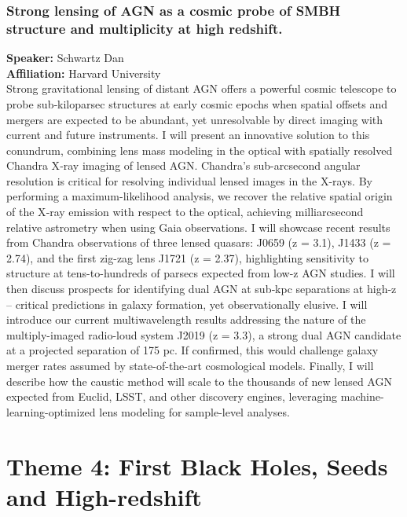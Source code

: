 \subsubsection*{Strong lensing of AGN as a cosmic probe of SMBH structure and multiplicity at high redshift.}
\textbf{Speaker:} Schwartz Dan \\
\textbf{Affiliation:} Harvard University\\
Strong gravitational lensing of distant AGN offers a powerful cosmic telescope to probe sub‑kiloparsec structures at early cosmic epochs when spatial offsets and mergers are expected to be abundant, yet unresolvable by direct imaging with current and future instruments. I will present an innovative solution to this conundrum, combining lens mass modeling in the optical with spatially resolved Chandra X‑ray imaging of lensed AGN. Chandra’s sub-arcsecond angular resolution is critical for resolving individual lensed images in the X-rays. By performing a maximum-likelihood analysis, we recover the relative spatial origin of the X‑ray emission with respect to the optical, achieving milliarcsecond relative astrometry when using Gaia observations. 
I will showcase recent results from Chandra observations of three lensed quasars: J0659 (z = 3.1), J1433 (z = 2.74), and the first zig-zag lens J1721 (z = 2.37), highlighting sensitivity to structure at tens-to-hundreds of parsecs expected from low-z AGN studies. I will then discuss prospects for identifying dual AGN at sub‑kpc separations at high-z – critical predictions in galaxy formation, yet observationally elusive. I will introduce our current multiwavelength results addressing the nature of the multiply-imaged radio-loud system J2019 (z = 3.3), a strong dual AGN candidate at a projected separation of 175 pc. If confirmed, this would challenge galaxy merger rates assumed by state-of-the-art cosmological models.
Finally, I will describe how the caustic method will scale to the thousands of new lensed AGN expected from Euclid, LSST, and other discovery engines, leveraging machine-learning-optimized lens modeling for sample-level analyses.

\section*{Theme 4: First Black Holes, Seeds and High-redshift}

